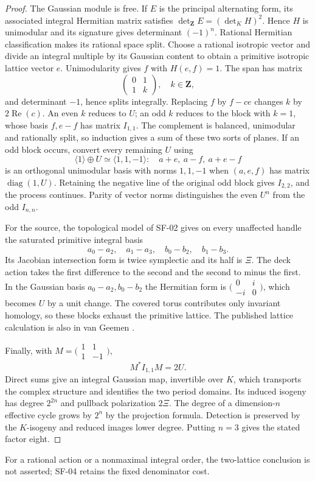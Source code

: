 \begin{proof}
The Gaussian module is free. If $E$ is the principal alternating
form, its associated integral Hermitian matrix satisfies
$\det_{\mathbf Z}E=(\det_K H)^2$. Hence $H$ is unimodular and its
signature gives determinant $(-1)^n$. Rational Hermitian
classification makes its rational space split. Choose a rational
isotropic vector and divide an integral multiple by its Gaussian
content to obtain a primitive isotropic lattice vector $e$.
Unimodularity gives $f$ with $H(e,f)=1$. The span has matrix
\[
 \begin{pmatrix}0&1\\1&k\end{pmatrix},\quad k\in\mathbf Z,
\]
and determinant $-1$, hence splits integrally. Replacing $f$ by
$f-ce$ changes $k$ by $2\operatorname{Re}(c)$. An even $k$ reduces
to $U$; an odd $k$ reduces to the block with $k=1$, whose basis
$f,e-f$ has matrix $I_{1,1}$. The complement is balanced,
unimodular and rationally split, so induction gives a sum of these
two sorts of planes. If an odd block occurs, convert every remaining
$U$ using
\[
 \langle1\rangle\oplus U\simeq\langle1,1,-1\rangle:
 \quad a+e,\ a-f,\ a+e-f
\]
is an orthogonal unimodular basis with norms $1,1,-1$ when
$(a,e,f)$ has matrix $\operatorname{diag}(1,U)$. Retaining the
negative line of the original odd block gives $I_{2,2}$, and the
process continues. Parity of vector norms distinguishes the even
$U^n$ from the odd $I_{n,n}$.

For the source, the topological model of SF-02 gives on every
unaffected handle the saturated primitive integral basis
\[
 a_0-a_2,\quad a_1-a_3,\quad b_0-b_2,\quad b_1-b_3.
\]
Its Jacobian intersection form is twice symplectic and its half is
$\Xi$. The deck action takes the first difference to the second and
the second to minus the first. In the Gaussian basis
$a_0-a_2,b_0-b_2$ the Hermitian form is
$\bigl(\begin{smallmatrix}0&i\\-i&0\end{smallmatrix}\bigr)$,
which becomes $U$ by a unit change. The covered torus contributes
only invariant homology, so these blocks exhaust the primitive
lattice. The published lattice calculation is also in van Geemen
\cite[Theorem~5.3(1)--(2), p.~629]{SF-vanGeemen1996}.

Finally, with
$M=\bigl(\begin{smallmatrix}1&1\\1&-1\end{smallmatrix}\bigr)$,
\[
 M^*I_{1,1}M=2U.
\]
Direct sums give an integral Gaussian map, invertible over $K$,
which transports the complex structure and identifies the two
period domains. Its induced isogeny has degree $2^{2n}$ and
pullback polarization $2\Xi$. The degree of a dimension-$n$
effective cycle grows by $2^n$ by the projection formula. Detection
is preserved by the $K$-isogeny and reduced images lower degree.
Putting $n=3$ gives the stated factor eight.
\end{proof}
For a rational action or a nonmaximal integral order, the two-lattice
conclusion is not asserted; SF-04 retains the fixed denominator cost.

